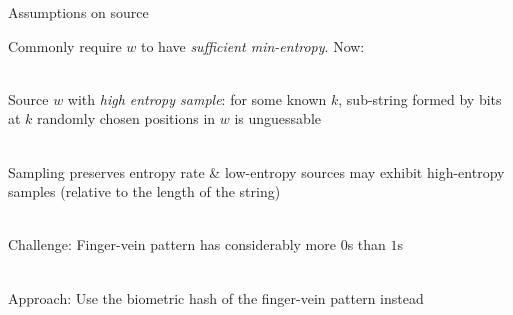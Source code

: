 \documentclass{beamer}
\begin{document}
\begin{frame}{Assumptions on source}

    Commonly require $w$ to have \textit{sufficient min-entropy}. Now:\\~\pause

    Source $w$ with \textit{high entropy sample}: for some known $k$, sub-string formed by bits at $k$ randomly chosen positions in $w$ is unguessable\\~\pause

    Sampling preserves entropy rate \& low-entropy sources may exhibit high-entropy samples (relative to the length of the string) \\~\pause   

\textcolor{dred}{Challenge:} Finger-vein pattern has considerably more $0$s than $1$s\\~\pause

\textcolor{dred}{Approach:} Use the biometric hash of the finger-vein pattern instead %
\end{frame}
\end{document}
